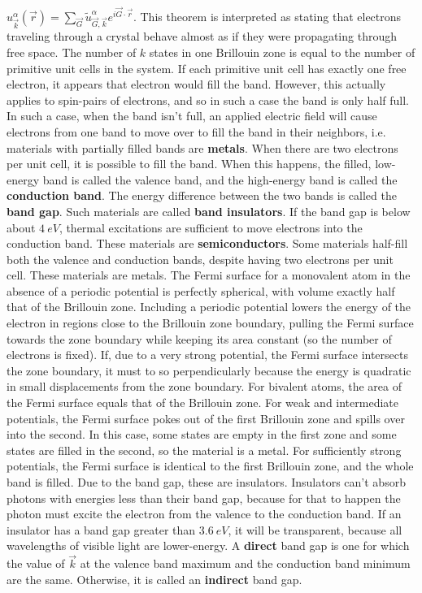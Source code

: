 \documentclass[10pt]{article}
\begin{document}
$u_{\vec{k}}^{\alpha}(\vec{r})=\sum_{\vec{G}}\tilde{u}_{\vec{G},\vec{k}}^{\alpha}e^{i\vec{G}\cdot\vec{r}}$.
This theorem is interpreted as stating that electrons traveling through a crystal behave almost as if they were propagating through
free space.
The number of $k$ states in one Brillouin zone is equal to the number of primitive unit cells in the system.
If each primitive unit cell has exactly one free electron, it appears that electron would fill the band.
However, this actually applies to spin-pairs of electrons, and so in such a case the band is only half full.
In such a case, when the band isn't full, an applied electric field will cause electrons from one band to move over to fill
the band in their neighbors, i.e. materials with partially filled bands are \textbf{metals}.
When there are two electrons per unit cell, it is possible to fill the band.
When this happens, the filled, low-energy band is called the valence band, and the high-energy band is called the
\textbf{conduction band}.
The energy difference between the two bands is called the \textbf{band gap}.
Such materials are called \textbf{band insulators}.
If the band gap is below about $\SI{4}{eV}$, thermal excitations are sufficient to move electrons into the conduction band.
These materials are \textbf{semiconductors}.
Some materials half-fill both the valence and conduction bands, despite having two electrons per unit cell.
These materials are metals.
The Fermi surface for a monovalent atom in the absence of a periodic potential is perfectly spherical, with volume exactly half
that of the Brillouin zone.
Including a periodic potential lowers the energy of the electron in regions close to the Brillouin zone boundary, pulling
the Fermi surface towards the zone boundary while keeping its area constant (so the number of electrons is fixed).
If, due to a very strong potential, the Fermi surface intersects the zone boundary, it must to so perpendicularly because
the energy is quadratic in small displacements from the zone boundary.
For bivalent atoms, the area of the Fermi surface equals that of the Brillouin zone.
For weak and intermediate potentials, the Fermi surface pokes out of the first Brillouin zone and spills over into the second.
In this case, some states are empty in the first zone and some states are filled in the second, so the material is a metal.
For sufficiently strong potentials, the Fermi surface is identical to the first Brillouin zone, and the whole band is filled.
Due to the band gap, these are insulators.
Insulators can't absorb photons with energies less than their band gap, because for that to happen the photon must excite the
electron from the valence to the conduction band.
If an insulator has a band gap greater than $\SI{3.6}{eV}$, it will be transparent, because all wavelengths of visible light are
lower-energy.
A \textbf{direct} band gap is one for which the value of $\vec{k}$ at the valence band maximum and the conduction band minimum are
the same.
Otherwise, it is called an \textbf{indirect} band gap.

\end{document}

